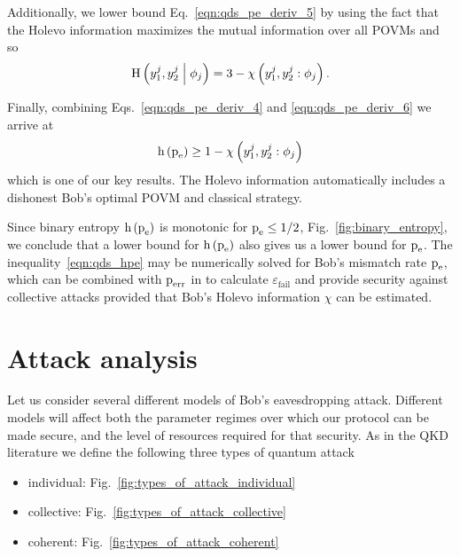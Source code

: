 \noindent Additionally, we lower bound Eq.~\ref{eqn:qds_pe_deriv_5} by using the fact that the Holevo information maximizes the mutual information over all POVMs 
and so
\begin{equation}\label{eqn:qds_pe_deriv_6}
\text{H}\left(y_1^j, y_2^j \; \middle| \; \phi_j \right) = 3 - \chi\left(y_1^j, y_2^j : \phi_j\right).
\end{equation}

\noindent Finally, combining Eqs.~\ref{eqn:qds_pe_deriv_4} and \ref{eqn:qds_pe_deriv_6} we arrive at
\begin{equation}\label{eqn:qds_hpe}
\text{h}\left(\text{p}_{\text{e}}\right) \ge 1 - \chi \left(y_1^j, y_2^j : \phi_j\right)
\end{equation}
which is one of our key results. The Holevo information automatically includes a dishonest Bob's optimal POVM and classical strategy.

Since binary entropy $\text{h}\left(\text{p}_{\text{e}}\right)$ is monotonic for $\text{p}_{\text{e}} \le 1/2$, Fig.~\ref{fig:binary_entropy}, we conclude that a lower bound for $\text{h}\left(\text{p}_{\text{e}}\right)$ also gives us a lower bound for $\text{p}_{\text{e}}$.  The inequality~\ref{eqn:qds_hpe} may be numerically solved for Bob's mismatch rate $\text{p}_{\text{e}}$, which can be combined with $\text{p}_{\text{err}}$ in to calculate $\varepsilon_{\text{fail}}$ and provide security against collective attacks  provided that Bob's Holevo information $\chi$ can be estimated.

\section{Attack analysis}\label{sec:qds_attack_analysis}
Let us consider several different models of Bob's eavesdropping attack. Different models will affect both the parameter regimes over which our protocol can be made secure, and the level of resources required for that security. As in the QKD literature we define the following three types of quantum attack
\begin{itemize}
\item individual: Fig.~\ref{fig:types_of_attack_individual}
\item collective: Fig.~\ref{fig:types_of_attack_collective}
\item coherent: Fig.~\ref{fig:types_of_attack_coherent}
\end{itemize}

